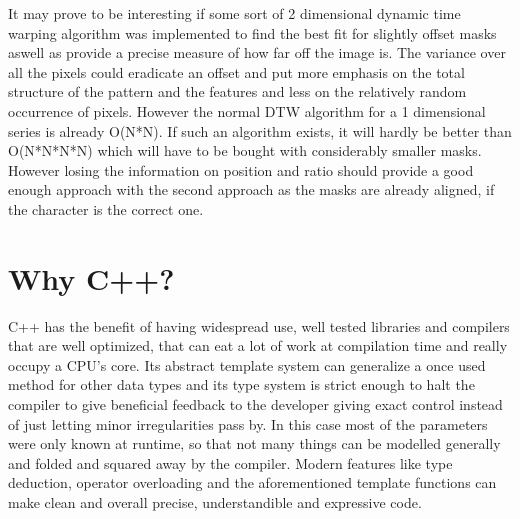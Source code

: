 It may prove to be interesting if some sort of 2 dimensional dynamic time warping algorithm was implemented to find the best fit for slightly offset masks aswell as provide a precise measure of how far off the image is. The variance over all the pixels could eradicate an offset and put more emphasis on the total structure of the pattern and the features and less on the relatively random occurrence of pixels. However the normal DTW algorithm for a 1 dimensional series is already O(N*N). If such an algorithm exists, it will hardly be better than O(N*N*N*N) which will have to be bought with considerably smaller masks. However losing the information on position and ratio should provide a good enough approach with the second approach as the masks are already aligned, if the character is the correct one.

\section {Why C++?}
C++ has the benefit of having widespread use, well tested libraries and compilers that are well optimized, that can eat a lot of work at compilation time and really occupy a CPU's core. Its abstract template system can generalize a once used method for other data types and its type system is strict enough to halt the compiler to give beneficial feedback to the developer giving exact control instead of just letting minor irregularities pass by. In this case most of the parameters were only known at runtime, so that not many things can be modelled generally and folded and squared away by the compiler. Modern features like type deduction, operator overloading and the aforementioned template functions can make clean and overall precise, understandible and expressive code. 





